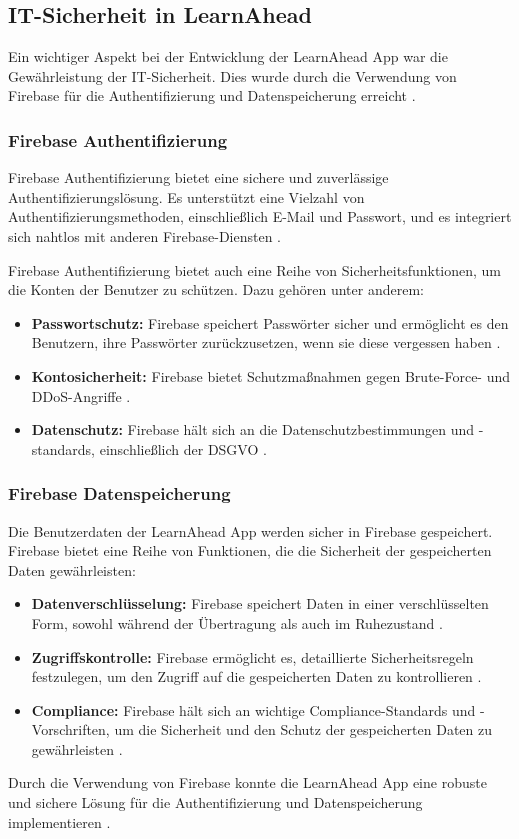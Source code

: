 \subsection{IT-Sicherheit in LearnAhead}
Ein wichtiger Aspekt bei der Entwicklung der LearnAhead App war die Gewährleistung der IT-Sicherheit. Dies wurde durch die Verwendung von Firebase für die Authentifizierung und Datenspeicherung erreicht \cite{firebase_overview}.

\subsubsection{Firebase Authentifizierung}
Firebase Authentifizierung bietet eine sichere und zuverlässige Authentifizierungslösung. Es unterstützt eine Vielzahl von Authentifizierungsmethoden, einschließlich E-Mail und Passwort, und es integriert sich nahtlos mit anderen Firebase-Diensten \cite{firebase_auth}.\newline

\noindent
Firebase Authentifizierung bietet auch eine Reihe von Sicherheitsfunktionen, um die Konten der Benutzer zu schützen. Dazu gehören unter anderem:
\begin{itemize}
    \item \textbf{Passwortschutz:} Firebase speichert Passwörter sicher und ermöglicht es den Benutzern, ihre Passwörter zurückzusetzen, wenn sie diese vergessen haben \cite{firebase_auth}.
    \item \textbf{Kontosicherheit:} Firebase bietet Schutzmaßnahmen gegen Brute-Force- und DDoS-Angriffe \cite{firebase_security}.
    \item \textbf{Datenschutz:} Firebase hält sich an die Datenschutzbestimmungen und -standards, einschließlich der DSGVO \cite{firebase_privacy}.
\end{itemize}
\subsubsection{Firebase Datenspeicherung}
Die Benutzerdaten der LearnAhead App werden sicher in Firebase gespeichert. Firebase bietet eine Reihe von Funktionen, die die Sicherheit der gespeicherten Daten gewährleisten: \cite{firebase_storage}
\begin{itemize}
    \item \textbf{Datenverschlüsselung:} Firebase speichert Daten in einer verschlüsselten Form, sowohl während der Übertragung als auch im Ruhezustand \cite{firebase_encryption}.
    \item \textbf{Zugriffskontrolle:} Firebase ermöglicht es, detaillierte Sicherheitsregeln festzulegen, um den Zugriff auf die gespeicherten Daten zu kontrollieren \cite{firebase_access_control}.
    \item \textbf{Compliance:} Firebase hält sich an wichtige Compliance-Standards und -Vorschriften, um die Sicherheit und den Schutz der gespeicherten Daten zu gewährleisten \cite{firebase_compliance}.
\end{itemize}
Durch die Verwendung von Firebase konnte die LearnAhead App eine robuste und sichere Lösung für die Authentifizierung und Datenspeicherung implementieren \cite{firebase_overview}.




